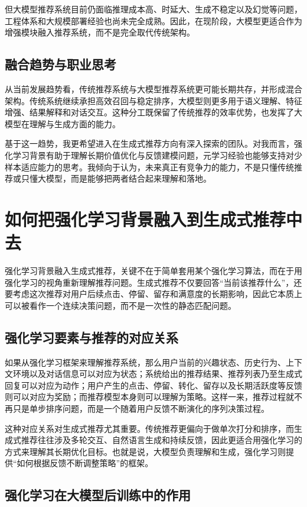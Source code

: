 \documentclass[UTF8]{ctexart}
\begin{document}
但大模型推荐系统目前仍面临推理成本高、时延大、生成不稳定以及幻觉等问题，工程体系和大规模部署经验也尚未完全成熟。因此，在现阶段，大模型更适合作为增强模块融入推荐系统，而不是完全取代传统架构。

\subsection{融合趋势与职业思考}

从当前发展趋势看，传统推荐系统与大模型推荐系统更可能长期共存，并形成混合架构。传统系统继续承担高效召回与稳定排序，大模型则更多用于语义理解、特征增强、结果解释和对话交互。这种分工既保留了传统推荐的效率优势，也发挥了大模型在理解与生成方面的能力。

基于这一趋势，我更希望进入在生成式推荐方向有深入探索的团队。对我而言，强化学习背景有助于理解长期价值优化与反馈建模问题，元学习经验也能够支持对少样本适应能力的思考。我倾向于认为，未来真正有竞争力的能力，不是只懂传统推荐或只懂大模型，而是能够把两者结合起来理解和落地。

\section{如何把强化学习背景融入到生成式推荐中去}

强化学习背景融入生成式推荐，关键不在于简单套用某个强化学习算法，而在于用强化学习的视角重新理解推荐问题。生成式推荐不仅要回答“当前该推荐什么”，还要考虑这次推荐对用户后续点击、停留、留存和满意度的长期影响，因此它本质上可以被看作一个连续决策问题，而不是一次性的静态匹配问题。

\subsection{强化学习要素与推荐的对应关系}

如果从强化学习框架来理解推荐系统，那么用户当前的兴趣状态、历史行为、上下文环境以及对话信息可以对应为状态；系统给出的推荐结果、推荐列表乃至生成式回复可以对应为动作；用户产生的点击、停留、转化、留存以及长期活跃度等反馈则可以对应为奖励；而推荐模型本身则可以理解为策略。这样一来，推荐过程就不再只是单步排序问题，而是一个随着用户反馈不断演化的序列决策过程。

这种对应关系对生成式推荐尤其重要。传统推荐更偏向于做单次打分和排序，而生成式推荐往往涉及多轮交互、自然语言生成和持续反馈，因此更适合用强化学习的方式来理解其长期优化目标。也就是说，大模型负责理解和生成，强化学习则提供“如何根据反馈不断调整策略”的框架。

\subsection{强化学习在大模型后训练中的作用}
\end{document}
